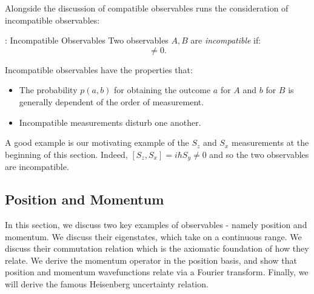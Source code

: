 Alongside the discussion of compatible observables runs the consideration of incompatible observables:

\begin{defbox}{: Incompatible Observables}
    Two observables $A, B$ are \emph{incompatible} if:
    \begin{equation}
        [A, B] \neq 0.
    \end{equation}
\end{defbox}
Incompatible observables have the properties that: 
\begin{itemize}
    \item The probability $p(a, b)$ for obtaining the outcome $a$ for $A$ and $b$ for $B$ is generally dependent of the order of measurement.
    \item Incompatible measurements disturb one another.
\end{itemize}
A good example is our motivating example of the $S_z$ and $S_x$ measurements at the beginning of this section. Indeed, $[S_z, S_x] = i\hbar S_y \neq 0$ and so the two observables are incompatible.  

\subsection{Position and Momentum}
In this section, we discuss two key examples of observables - namely position and momentum. We discuss their eigenstates, which take on a continuous range. We discuss their commutation relation which is the axiomatic foundation of how they relate. We derive the momentum operator in the position basis, and show that position and momentum wavefunctions relate via a Fourier transform. Finally, we will derive the famous Heisenberg uncertainty relation.
